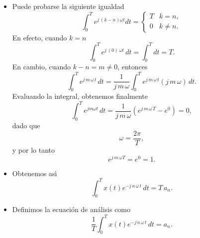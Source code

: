 \begin{itemize}
        \item   Puede probarse la siguiente igualdad
        \begin{equation}
            \int_{0}^{T}e^{j \, \left( k-n\right) \omega t}dt= 
            \left\{\begin{array}{ll}
                                T & k=n, \\ 
                                0 & k \neq n.
                   \end{array} \right.
        \end{equation}
        En efecto, cuando $k=n$
        \begin{equation}
                \int_{0}^{T}e^{j \, \left( 0 \right) \, \omega t} \, dt= 
                \int_{0}^{T} dt= T.
        \end{equation}
        En cambio, cuando $k-n = m \neq 0$, entonces
        \begin{equation}
           \int_{0}^{T}e^{j \, m \, \omega \, t} \, dt= 
           \frac{1}{j \, m \, \omega} \int_{0}^{T}e^{j \, m \, \omega \, t} (j \, m \, \omega) \, dt.
        \end{equation}
        Evaluando la integral, obtenemos finalmente
        \begin{equation}
           \int_{0}^{T}e^{j m \omega t} \, dt= 
                \frac{1}{j \, m \, \omega} (e^{j \, m \, \omega \, T} - e^{0}) = 0,
        \end{equation}
        dado que
        \begin{equation}
          \omega = \frac{2 \pi}{T},
        \end{equation}
        y por lo tanto
        \begin{equation}
          e^{j \, m \, \omega T} = e^{0} = 1.
        \end{equation}

        \item   Obtenemos as\'{\i}
        \begin{equation}
            \int_{0}^{T}x\left( t\right) e^{-j \, n \, \omega \, t} \, dt = T \, a_n.
        \end{equation}
        
        \item   Definimos la ecuaci\'{o}n de an\'{a}lisis como
        \begin{equation}
            \frac{1}{T}\int_{0}^{T}x\left( t\right) e^{-j \, n \,
              \omega \, t} \, dt = a_n. \label{anafs}
        \end{equation}
\end{itemize}


